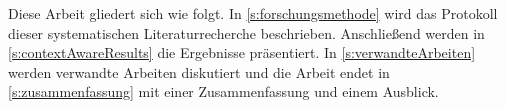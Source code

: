 \documentclass[conference,compsoc,ngerman]{IEEEtran}
\begin{document}
Diese Arbeit gliedert sich wie folgt. In \cref{s:forschungsmethode} wird das Protokoll dieser systematischen Literaturrecherche beschrieben. Anschließend werden in \cref{s:contextAwareResults} die Ergebnisse präsentiert. In \cref{s:verwandteArbeiten} werden verwandte Arbeiten diskutiert und die Arbeit endet in \cref{s:zusammenfassung} mit einer Zusammenfassung und einem Ausblick.




%
%



%
%
\end{document}
